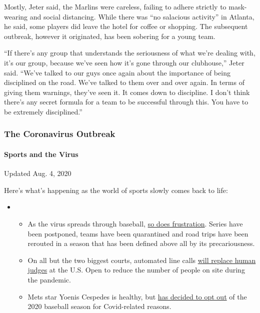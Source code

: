 Mostly, Jeter said, the Marlins were careless, failing to adhere
strictly to mask-wearing and social distancing. While there was ``no
salacious activity'' in Atlanta, he said, some players did leave the
hotel for coffee or shopping. The subsequent outbreak, however it
originated, has been sobering for a young team.

``If there's any group that understands the seriousness of what we're
dealing with, it's our group, because we've seen how it's gone through
our clubhouse,'' Jeter said. ``We've talked to our guys once again about
the importance of being disciplined on the road. We've talked to them
over and over again. In terms of giving them warnings, they've seen it.
It comes down to discipline. I don't think there's any secret formula
for a team to be successful through this. You have to be extremely
disciplined.''

\hypertarget{the-coronavirus-outbreak}{%
\subsubsection{The Coronavirus
Outbreak}\label{the-coronavirus-outbreak}}

\hypertarget{sports-and-the-virus}{%
\paragraph{Sports and the Virus}\label{sports-and-the-virus}}

Updated Aug. 4, 2020

Here's what's happening as the world of sports slowly comes back to
life:

\begin{itemize}
\item
  \begin{itemize}
  \tightlist
  \item
    As the virus spreads through baseball,
    \href{https://www.nytimes.com/2020/08/03/sports/baseball/mlb-coronavirus-outbreak.html?action=click\&pgtype=Article\&state=default\&region=MAIN_CONTENT_2\&context=storylines_keepup}{so
    does frustration}. Series have been postponed, teams have been
    quarantined and road trips have been rerouted in a season that has
    been defined above all by its precariousness.
  \item
    On all but the two biggest courts, automated line calls
    \href{https://www.nytimes.com/2020/08/03/sports/tennis/us-open-hawkeye-line-judges.html?action=click\&pgtype=Article\&state=default\&region=MAIN_CONTENT_2\&context=storylines_keepup}{will
    replace human judges} at the U.S. Open to reduce the number of
    people on site during the pandemic.
  \item
    Mets star Yoenis Cespedes is healthy, but
    \href{https://www.nytimes.com/2020/08/02/sports/baseball/Yoenis-cespedes-opt-out-rule.html?action=click\&pgtype=Article\&state=default\&region=MAIN_CONTENT_2\&context=storylines_keepup}{has
    decided to opt out} of the 2020 baseball season for Covid-related
    reasons.
  \end{itemize}
\end{itemize}

